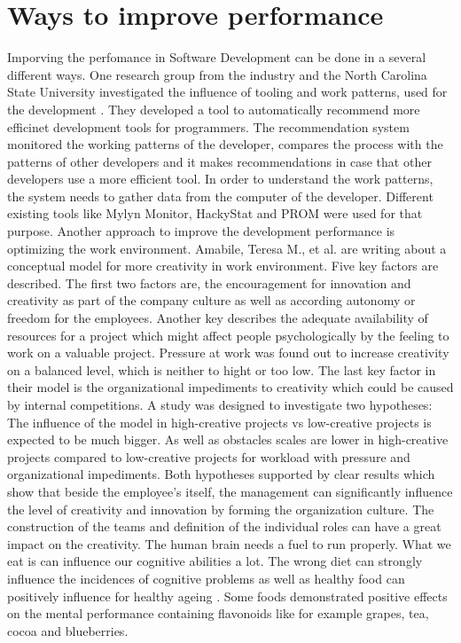 \section{Ways to improve performance}
Imporving the perfomance in Software Development can be done in a several different ways. One research group from the industry and the North Carolina State University investigated the influence of tooling and work patterns, used for the development \cite{snipes2013towards}. They developed a tool to automatically recommend more efficinet development tools for programmers. The recommendation system monitored the working patterns of the developer, compares the process with the patterns of other developers and it makes recommendations in case that other developers use a more efficient tool.
In order to understand the work patterns, the system needs to gather data from the computer of the developer. Different existing tools like Mylyn Monitor, HackyStat and PROM were used for that purpose.
Another approach to improve the development performance is optimizing the work environment. Amabile, Teresa M., et al. \cite{amabile1996assessing} are writing about a conceptual model for more creativity in work environment. Five key factors are described. The first two factors are, the encouragement for innovation and creativity as part of the company culture as well as according autonomy or freedom for the employees. Another key describes the adequate availability of resources for a project which might affect people psychologically by the feeling to work on a valuable project. Pressure at work was found out to increase creativity on a balanced level, which is neither to hight or too low. The last key factor in their model is the organizational impediments to creativity which could be caused by internal competitions.
A study was designed to investigate two hypotheses: The influence of the model in high-creative projects vs low-creative projects is expected to be much bigger. As well as obstacles scales are lower in high-creative projects compared to low-creative projects for workload with pressure and organizational impediments.
Both hypotheses supported by clear results which show that beside the employee's itself, the management can significantly influence the level of creativity and innovation by forming the organization culture. The construction of the teams and definition of the individual roles can have a great impact on the creativity. 
The human brain needs a fuel to run properly. What we eat is can influence our cognitive abilities a lot. The wrong diet can strongly influence the incidences of cognitive problems as well as healthy food can positively influence for healthy ageing \cite{spencer2008food}. Some foods demonstrated positive effects on the mental performance containing flavonoids like for example grapes, tea, cocoa and blueberries. 
